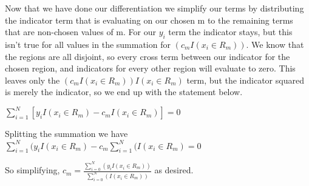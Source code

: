 \documentclass[11pt]{article}
\begin{document}
\vspace{3 mm}
\noindent
Now that we have done our differentiation we simplify our terms by distributing the indicator term that is evaluating on our chosen m to the remaining terms that are non-chosen values of m. For our $y_{i}$ term the indicator stays, but this isn't true for all values in the summation for $(c_{m}I(x_{i} \in R_{m}))$.  We know that the regions are all disjoint, so every cross term between our indicator for the chosen region, and indicators for every other region will evaluate to zero.  This leaves only the $(c_{m}I(x_{i} \in R_{m}))I(x_{i} \in R_{m})$ term, but the indicator squared is merely the indicator, so we end up with the statement below.

\vspace{3 mm}
\noindent
$\sum\limits_{i=1}^N [y_{i}I(x_{i} \in R_{m}) - c_{m}I(x_{i} \in R_{m})] = 0$ 

\vspace{3 mm}
\noindent
Splitting the summation we have $\sum\limits_{i=1}^N (y_{i}I(x_{i} \in R_{m}) - c_{m}\sum\limits_{i=1}^N (I(x_{i} \in R_{m}) = 0$

\vspace{3 mm}
\noindent
So simplifying, ${c}_{m} = \frac{\sum\limits_{i=0}^N (y_{i} I(x_{i} \in R_{m}))}{\sum\limits_{i=0}^N (I(x_{i} \in R_{m}))}$ as desired.
\end{document}
